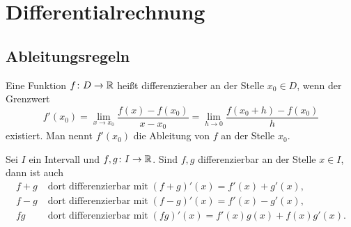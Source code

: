 \newpage
\section{Differentialrechnung}

\subsection{Ableitungsregeln}

\begin{Definition}%
\label{diff}
Eine Funktion $f\colon D\to\mathbb R$ heißt differenzieraber an der Stelle
$x_0\in D$, wenn der Grenzwert%
\[f'(x_0) = \lim_{x\to x_0}\frac{f(x)-f(x_0)}{x-x_0}
= \lim_{h\to 0}\frac{f(x_0+h)-f(x_0)}{h}\]
existiert. Man nennt $f'(x_0)$ die Ableitung von $f$ an der Stelle
$x_0$.
\end{Definition}

\begin{Satz}\label{diff-add-sub-mul}
Sei $I$ ein Intervall und $f,g\colon I\to\mathbb R$. Sind $f,g$
differenzierbar an der Stelle $x\in I$, dann ist auch%
\begin{align*}
f+g&\;\text{dort differenzierbar mit}\;(f+g)'(x)=f'(x)+g'(x),\\
f-g&\;\text{dort differenzierbar mit}\;(f-g)'(x)=f'(x)-g'(x),\\
fg&\;\text{dort differenzierbar mit}\;(fg)'(x)=f'(x)g(x)+f(x)g'(x).
\end{align*}
\end{Satz}

